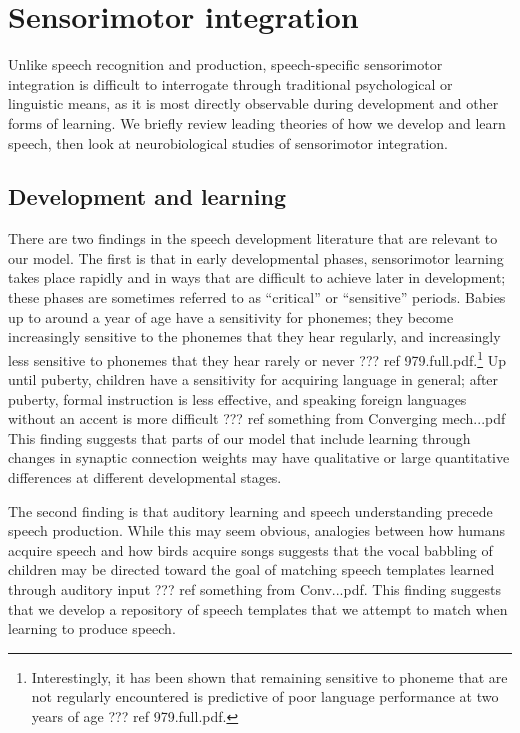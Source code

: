 
\section{Sensorimotor integration}

Unlike speech recognition and production,
speech-specific sensorimotor integration
is difficult to interrogate through
traditional psychological or linguistic means,
as it is most directly observable
during development and other forms of learning.
We briefly review leading theories
of how we develop and learn speech,
then look at neurobiological studies
of sensorimotor integration.

\subsection{Development and learning}

There are two findings in the
speech development literature
that are relevant to our model.
The first is that in
early developmental phases,
sensorimotor learning
takes place rapidly
and in ways that are difficult
to achieve later in development;
these phases are sometimes referred
to as ``critical'' or ``sensitive'' periods.
Babies up to around a year of age
have a sensitivity for phonemes;
they become increasingly sensitive
to the phonemes that they hear regularly,
and increasingly less sensitive
to phonemes that they hear rarely or never
??? ref 979.full.pdf.\footnote{
  Interestingly, it has been shown that
  remaining sensitive to phoneme
  that are not regularly encountered
  is predictive of poor language performance
  at two years of age ??? ref 979.full.pdf.}
Up until puberty,
children have a sensitivity for
acquiring language in general;
after puberty, formal instruction
is less effective,
and speaking foreign languages
without an accent is more difficult
??? ref something from Converging mech...pdf
This finding suggests that
parts of our model
that include learning
through changes in synaptic connection weights
may have qualitative or large quantitative
differences at different developmental stages.

The second finding is that
auditory learning
and speech understanding precede
speech production.
While this may seem obvious,
analogies between how humans acquire speech
and how birds acquire songs suggests that
the vocal babbling of children
may be directed toward the goal of
matching speech templates learned
through auditory input
??? ref something from Conv...pdf.
This finding suggests that
we develop a repository of speech templates
that we attempt to match when
learning to produce speech.

